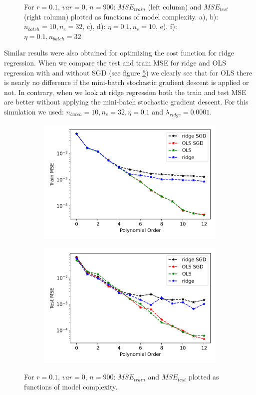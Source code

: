 \begin{figure}[H]
\begin{subfigure}{.49\textwidth}
  \caption{}
  \label{fig:olssgd_test_epoch}
\end{subfigure}
\caption{For $r=0.1$, $var=0$, $n=900$: $MSE_{train}$ (left column) and $MSE_{test}$ (right column) plotted as functions of model complexity. a), b): $n_{batch}=10, n_e=32$, c), d): $\eta=0.1, n_e=10$, e), f): $\eta=0.1, n_{batch}=32$}
\label{fig:ols_sgd}
\end{figure}
Similar results were also obtained for optimizing the cost function for ridge regression. When we compare the test and train MSE for ridge and OLS regression with and without SGD (see figure \ref{fig:ols_sgd_ridge}) we clearly see that for OLS there is nearly no difference if the mini-batch stochastic gradient descent is applied or not. In contrary, when we look at ridge regression both the train and test MSE are better without applying the mini-batch stochastic gradient descent. For this simulation we used:  $n_{batch}=10, n_e=32, \eta=0.1$ and $\lambda_{ridge}=0.0001$. 
\begin{figure}[H]
	\centering
	\begin{subfigure}{.5\textwidth}
		\centering
		\includegraphics[width=.9\linewidth]{Images/sgd_ols_ridge_train.png}
		\caption{}
		\label{fig:ols_sgd_ridge_train}
	\end{subfigure}%
	\begin{subfigure}{.5\textwidth}
		\centering
		\includegraphics[width=.9\linewidth]{Images/sgd_ols_ridge_test.png}
		\caption{}
		\label{fig:ols_sgd_ridge_test}
	\end{subfigure}
	\caption{For $r=0.1$, $var=0$, $n=900$: $MSE_{train}$ and $MSE_{test}$ plotted as functions of model complexity.}
	\label{fig:ols_sgd_ridge}
\end{figure}
